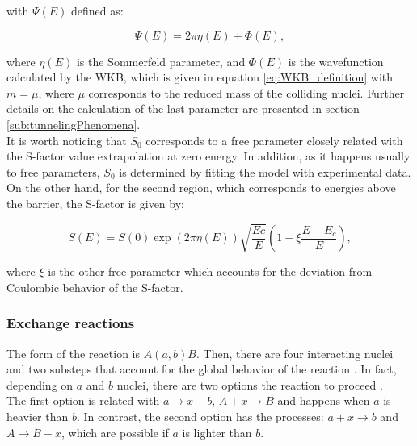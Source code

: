 \documentclass[openany]{book}
\begin{document}
with $\Psi(E)$ defined as: 

\begin{equation}  \label{eq:potential_Yakovlev_psiWKB}
	\Psi(E) = 2\pi\eta(E) + \Phi(E),
\end{equation}

where $\eta(E)$ is the Sommerfeld parameter, and $\Phi(E)$ is the wavefunction calculated by the WKB, which is given in equation \ref{eq:WKB_definition} with $m = \mu$, where $\mu$ corresponds to the reduced mass of the colliding nuclei. Further details on the calculation of the last parameter are presented in section \ref{sub:tunnelingPhenomena}. \\

It is worth noticing that $S_0$ corresponds to a free parameter closely related with the S-factor value extrapolation at zero energy. In addition, as it happens usually to free parameters, $S_0$ is determined by fitting the model with experimental data. \\

On the other hand, for the second region, which corresponds to energies above the barrier, the S-factor is given by:

\begin{equation}  \label{eq:potential_Yakovlev_sfactor_aboveBarrier}
	S(E) = S(0) \exp ({2\pi\eta(E)}) \sqrt{\frac{Ec}{E}} \left( 1 + \xi\frac{E - E_c}{E} \right),
\end{equation}

where $\xi$ is the other free parameter which accounts for the deviation from Coulombic behavior of the S-factor.  \\

\subsubsection{Exchange reactions} \label{ssub:potential_calculations_exchange}

The form of the reaction is $A(a, b)B$. Then, there are four interacting nuclei and two substeps that account for the global behavior of the reaction . In fact, depending on  $a$ and $b$ nuclei, there are two options the reaction to proceed \cite{xu_takahashi_goriely_arnould_ohta_utsunomiya_2013}. \\

The first option is related with $ a \rightarrow x + b$,  $A + x \rightarrow B$ and happens when $a$ is heavier than $b$. In contrast, the second option has the processes: $a + x \rightarrow b$ and $A \rightarrow B + x$, which are possible if $a$ is lighter than $b$. \\
\end{document}
